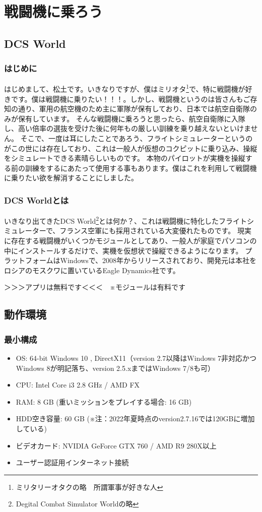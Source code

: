 \chapter{戦闘機に乗ろう}
\section{DCS World}
\subsection{はじめに}
はじめまして、松土です。いきなりですが、僕はミリオタ\footnote{ミリタリーオタクの略　所謂軍事が好きな人}で、特に戦闘機が好きです。僕は戦闘機に乗りたい！！！。しかし、戦闘機というのは皆さんもご存知の通り、軍用の航空機のため主に軍隊が保有しており、日本では航空自衛隊のみが保有しています。
そんな戦闘機に乗ろうと思ったら、航空自衛隊に入隊し、高い倍率の選抜を受けた後に何年もの厳しい訓練を乗り越えないといけません。
そこで、一度は耳にしたことであろう、フライトシミュレーターというのがこの世には存在しており、これは一般人が仮想のコクピットに乗り込み、操縦をシミュレートできる素晴らしいものです。
本物のパイロットが実機を操縦する前の訓練をするにあたって使用する事もあります。僕はこれを利用して戦闘機に乗りたい欲を解消することにしました。
\subsection{DCS Worldとは}
いきなり出てきたDCS World\footnote{Degital Combat Simulator Worldの略}とは何か？、これは戦闘機に特化したフライトシミュレーターで、フランス空軍にも採用されている大変優れたものです。
現実に存在する戦闘機がいくつかモジュールとしてあり、一般人が家庭でパソコンの中にインストールするだけで、実機を仮想状で操縦できるようになります。
プラットフォームはWindowsで、2008年からリリースされており、開発元は本社をロシアのモスクワに置いているEagle Dynamics社です。


＞＞＞アプリは無料です＜＜＜　※モジュールは有料です
\section{動作環境}
\subsection{最小構成}
\begin{itemize}
  \item OS: 64-bit Windows 10 , DirectX11（version 2.7以降はWindows 7非対応かつWindows 8が明記落ち、version 2.5.xまではWindows 7/8も可）
  \item CPU: Intel Core i3 2.8 GHz / AMD FX
  \item RAM: 8 GB (重いミッションをプレイする場合: 16 GB)
  \item HDD空き容量: 60 GB (※注：2022年夏時点のversion2.7.16では120GBに増加している)
  \item ビデオカード: NVIDIA GeForce GTX 760 / AMD R9 280X以上
  \item ユーザー認証用インターネット接続
\end{itemize}

